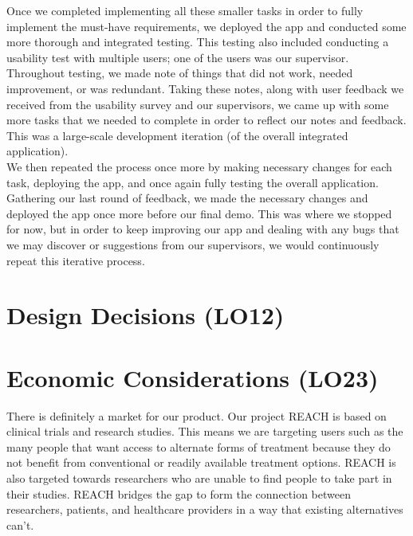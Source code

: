 \documentclass{article}
\begin{document}
Once we completed implementing all these smaller tasks in order to fully implement the must-have 
requirements, we deployed the app and conducted some more thorough and integrated testing. This testing 
also included conducting a usability test with multiple users; one of the users was our supervisor. 
Throughout testing, we made note of things that did not work, needed improvement, or was redundant. 
Taking these notes, along with user feedback we received from the usability survey and our supervisors, 
we came up with some more tasks that we needed to complete in order to reflect our notes and feedback. 
This was a large-scale development iteration (of the overall integrated application).\\

We then repeated the process once more by making necessary changes for each task, deploying the app, 
and once again fully testing the overall application. Gathering our last round of feedback, we made 
the necessary changes and deployed the app once more before our final demo. This was where we stopped 
for now, but in order to keep improving our app and dealing with any bugs that we may discover or 
suggestions from our supervisors, we would continuously repeat this iterative process.

\section{Design Decisions (LO12)}


\section{Economic Considerations (LO23)}


There is definitely a market for our product. Our project REACH is based on clinical trials and 
research studies. This means we are targeting users such as the many people that want access to 
alternate forms of treatment because they do not benefit from conventional or readily available 
treatment options. REACH is also targeted towards researchers who are unable to find people to take 
part in their studies. REACH bridges the gap to form the connection between researchers, patients, 
and healthcare providers in a way that existing alternatives can't.\\
\end{document}
